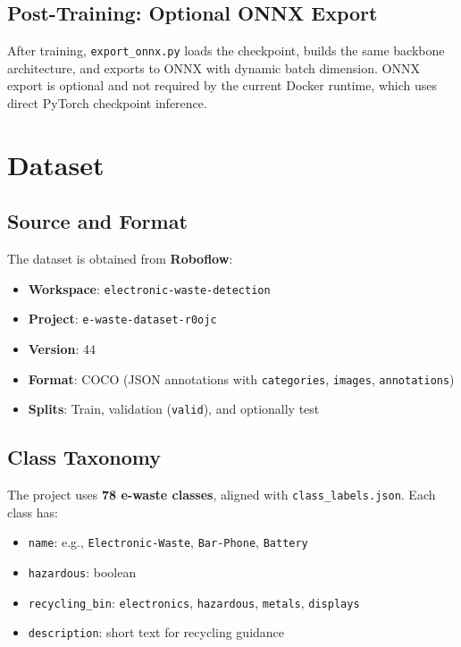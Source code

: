 \documentclass[11pt,a4paper]{article}
\begin{document}
\subsection{Post-Training: Optional ONNX Export}

After training, \texttt{export\_onnx.py} loads the checkpoint, builds the same backbone architecture, and exports to ONNX with dynamic batch dimension. ONNX export is optional and not required by the current Docker runtime, which uses direct PyTorch checkpoint inference.

\section{Dataset}
\label{sec:dataset}

\subsection{Source and Format}

The dataset is obtained from \textbf{Roboflow}:

\begin{itemize}[noitemsep]
    \item \textbf{Workspace}: \texttt{electronic-waste-detection}
    \item \textbf{Project}: \texttt{e-waste-dataset-r0ojc}
    \item \textbf{Version}: 44
    \item \textbf{Format}: COCO (JSON annotations with \texttt{categories}, \texttt{images}, \texttt{annotations})
    \item \textbf{Splits}: Train, validation (\texttt{valid}), and optionally test
\end{itemize}

\subsection{Class Taxonomy}

The project uses \textbf{78 e-waste classes}, aligned with \texttt{class\_labels.json}. Each class has:

\begin{itemize}[noitemsep]
    \item \texttt{name}: e.g., \texttt{Electronic-Waste}, \texttt{Bar-Phone}, \texttt{Battery}
    \item \texttt{hazardous}: boolean
    \item \texttt{recycling\_bin}: \texttt{electronics}, \texttt{hazardous}, \texttt{metals}, \texttt{displays}
    \item \texttt{description}: short text for recycling guidance
\end{itemize}
\end{document}
